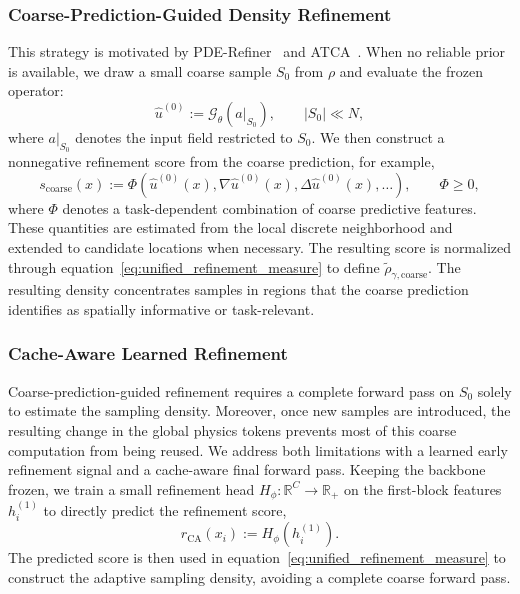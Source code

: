 \documentclass{article}
\def\eqref#1{equation~\ref{#1}}
\begin{document}
\subsubsection{Coarse-Prediction-Guided Density Refinement}
\label{sec:coarse_prediction_refinement}

This strategy is motivated by PDE-Refiner~\citep{lippe2023pderefiner}
and ATCA~\citep{jenkins2026atca}. When no reliable prior is available,
we draw a small coarse sample $S_0$ from $\rho$ and evaluate the frozen
operator:
\begin{equation}
    \widehat{u}^{(0)}
    :=\mathcal{G}_{\theta}\!\left(a\big|_{S_0}\right),
    \qquad |S_0|\ll N,
    \label{eq:coarse_draft_prediction}
\end{equation}
where $a\big|_{S_0}$ denotes the input field restricted to $S_0$.
We then construct a nonnegative refinement score from the coarse prediction,
for example,
\begin{equation}
    s_{\mathrm{coarse}}(x)
    :=\Phi\!\left(
        \widehat{u}^{(0)}(x),
        \nabla\widehat{u}^{(0)}(x),
        \Delta\widehat{u}^{(0)}(x),
        \ldots
    \right),
    \qquad \Phi\geq0,
    \label{eq:coarse_refinement_score}
\end{equation}
where $\Phi$ denotes a task-dependent combination of coarse predictive
features. These quantities are estimated from the local discrete neighborhood
and extended to candidate locations when necessary. The resulting score is
normalized through \eqref{eq:unified_refinement_measure} to define
$\widetilde{\rho}_{\gamma,\mathrm{coarse}}$. The resulting density concentrates samples in regions that the coarse prediction
identifies as spatially informative or task-relevant.

\subsubsection{Cache-Aware Learned Refinement}
\label{sec:cache_aware_refinement}

Coarse-prediction-guided refinement requires a complete forward pass on
$S_0$ solely to estimate the sampling density. Moreover, once new samples are
introduced, the resulting change in the global physics tokens prevents most
of this coarse computation from being reused. We address both limitations with
a learned early refinement signal and a cache-aware final forward pass. Keeping the backbone frozen, we train a small refinement head
$H_\phi:\mathbb{R}^C\rightarrow\mathbb{R}_{+}$ on the first-block features
$h_i^{(1)}$ to directly predict the refinement score,
\begin{equation}
    r_{\mathrm{CA}}(x_i)
    := H_\phi\!\left(h_i^{(1)}\right).
    \label{eq:learned_refinement_score}
\end{equation}
The predicted score is then used in
\eqref{eq:unified_refinement_measure} to construct the adaptive sampling
density, avoiding a complete coarse forward pass.
\end{document}

